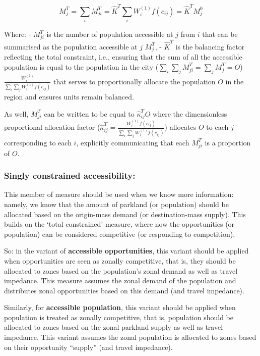 \documentclass[
11pt, %
oneside, %
english, %
singlespacing, %
]{macthesis} %
\begin{document}
\begin{equation}
\label{eq:total-constrained-market}
M^T_{j} = \sum_i M^T_{ji} = \hat K^T \sum_i W_i^{(1)} f(c_{ij}) = \hat K^T M_{j}^0
\end{equation} 

Where:
- \(M^T_{ji}\) is the number of population accessible at \(j\) from \(i\) that can be summarised as the population accessible at \(j\) \(M^T_{j}\),
- \(\hat K^T\) is the balancing factor reflecting the total constraint, i.e., ensuring that the sum of all the accessible population is equal to the population in the city (\(\sum_i\sum_j M^T_{ji} = \sum_j M^T_{j} = O\)) \(\frac{W^{(1)}_i}{\sum_i\sum_j W^{(1)}_if(c_{ij})}\) that serves to proportionally allocate the population \(O\) in the region and ensures units remain balanced.

As well, \(M^T_{ji}\) can be written to be equal to \(\hat\kappa_{ij}^T O\) where the dimensionless proportional allocation factor (\(\hat \kappa_{ij}^T = \frac{W_i^{(1)} f(c_{ij})}{\sum_i\sum_j W^{(1)}_i f(c_{ij})}\)) allocates \(O\) to each \(j\) corresponding to each \(i\), explicitly communicating that each \(M^T_{ji}\) is a proportion of \(O\).

\subsubsection{Singly constrained accessibility:}\label{singly-constrained-accessibility-1}

This member of measure should be used when we know more information: namely, we know that the amount of parkland (or population) should be allocated based on the origin-mass demand (or destination-mass supply). This builds on the `total constrained' measure, where now the opportunities (or population) can be considered competitive (or responding to competition).

So: in the variant of \textbf{accessible opportunities}, this variant should be applied when opportunities are seen as zonally competitive, that is, they should be allocated to zones based on the population's zonal demand as well as travel impedance. This measure assumes the zonal demand of the population and distributes zonal opportunities based on this demand (and travel impedance).

Similarly, for \textbf{accessible population}, this variant should be applied when population is treated as zonally competitive, that is, population should be allocated to zones based on the zonal parkland supply as well as travel impedance. This variant assumes the zonal population is allocated to zones based on their opportunity ``supply'' (and travel impedance).
\end{document}
